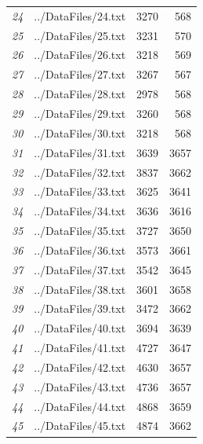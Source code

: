 \documentclass[12pt]{article}
\begin{document}
\begin{table}[ht]
{\begin{tabular}{rlrr}
								{\textit{24}} & ../DataFiles/24.txt & 3270 & 568 \\ 
								{\textit{25}} & ../DataFiles/25.txt & 3231 & 570 \\ 
								{\textit{26}} & ../DataFiles/26.txt & 3218 & 569 \\ 
								{\textit{27}} & ../DataFiles/27.txt & 3267 & 567 \\ 
								{\textit{28}} & ../DataFiles/28.txt & 2978 & 568 \\ 
								{\textit{29}} & ../DataFiles/29.txt & 3260 & 568 \\ 
								{\textit{30}} & ../DataFiles/30.txt & 3218 & 568 \\ 
								{\textit{31}} & ../DataFiles/31.txt & 3639 & 3657 \\ 
								{\textit{32}} & ../DataFiles/32.txt & 3837 & 3662 \\ 
								{\textit{33}} & ../DataFiles/33.txt & 3625 & 3641 \\ 
								{\textit{34}} & ../DataFiles/34.txt & 3636 & 3616 \\ 
								{\textit{35}} & ../DataFiles/35.txt & 3727 & 3650 \\ 
								{\textit{36}} & ../DataFiles/36.txt & 3573 & 3661 \\ 
								{\textit{37}} & ../DataFiles/37.txt & 3542 & 3645 \\ 
								{\textit{38}} & ../DataFiles/38.txt & 3601 & 3658 \\ 
								{\textit{39}} & ../DataFiles/39.txt & 3472 & 3662 \\ 
								{\textit{40}} & ../DataFiles/40.txt & 3694 & 3639 \\ 
								{\textit{41}} & ../DataFiles/41.txt & 4727 & 3647 \\ 
								{\textit{42}} & ../DataFiles/42.txt & 4630 & 3657 \\ 
								{\textit{43}} & ../DataFiles/43.txt & 4736 & 3657 \\ 
								{\textit{44}} & ../DataFiles/44.txt & 4868 & 3659 \\ 
								{\textit{45}} & ../DataFiles/45.txt & 4874 & 3662 \\ 
								\hline
							\end{tabular}
						}
					\clearpage
					\end{table}
					
\end{document}
